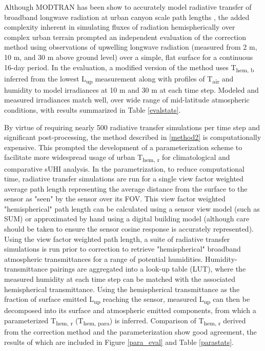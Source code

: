 \begin{bibunit}
Although MODTRAN has been show to accurately model radiative transfer of broadband longwave radiation at urban canyon scale path lengths \citep{Hoch2005, Hoch2007}, the added complexity inherent in simulating fluxes of radiation hemispherically over complex urban terrain prompted an independent evaluation of the correction method using observations of upwelling longwave radiation (measured from 2 \si{\meter}, 10 \si{\meter}, and 30 \si{\meter} above ground level) over a simple, flat surface for a continuous 16-day period. In the evaluation, a modified version of the method uses T\textsubscript{hem, b} inferred from the lowest L\textsubscript{up} measurement along with profiles of T\textsubscript{air} and humidity to model irradiances at 10 \si{\meter} and 30 \si{\meter} at each time step. Modeled and measured irradiances match well, over wide range of mid-latitude atmospheric conditions, with results summarized in Table \ref{evalstats}.

By virtue of requiring nearly 500 radiative transfer simulations per time step and significant post-processing, the method described in \ref{method2} is computationally expensive. This prompted the development of a parameterization scheme to facilitate more widespread usage of urban T\textsubscript{hem, r} for climatological and comparative sUHI analysis. In the parametrization, to reduce computational time, radiative transfer simulations are run for a single view factor weighted average path length representing the average distance from the surface to the sensor as "seen" by the sensor over its FOV. This view factor weighted "hemispherical" path length can be calculated using a sensor view model (such as SUM) or approximated by hand using a digital building model (although care should be taken to ensure the sensor cosine response is accurately represented). Using the view factor weighted path length, a suite of radiative transfer simulations is run prior to correction to retrieve "hemispherical" broadband atmospheric transmittances for a range of potential humidities. Humidity-transmittance pairings are aggregated into a look-up table (LUT), where the measured humidity at each time step can be matched with the associated hemispherical transmittance. Using the hemispherical transmittance as the fraction of surface emitted L\textsubscript{up} reaching the sensor, measured L\textsubscript{up} can then be decomposed into its surface and atmospheric emitted components, from which a parameterized T\textsubscript{hem, r} (T\textsubscript{hem, para}) is inferred. Comparison of T\textsubscript{hem, r} derived from the correction method and the parameterization show good agreement, the results of which are included in Figure \ref{para_eval} and Table \ref{parastats}.


\end{bibunit}
